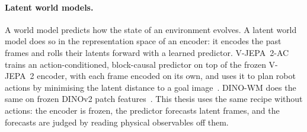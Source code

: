 \paragraph{Latent world models.} A world model predicts how the state of an environment
evolves. A latent world model does so in the representation space of an encoder: it
encodes the past frames and rolls their latents forward with a learned predictor.
V-JEPA~2-AC trains an action-conditioned, block-causal predictor on top of the frozen
V-JEPA~2 encoder, with each frame encoded on its own, and uses it to plan robot actions
by minimising the latent distance to a goal image~\cite{assran2025vjepa2}. DINO-WM does
the same on frozen DINOv2 patch features~\cite{dinowm}. This thesis uses the same recipe
without actions: the encoder is frozen, the predictor forecasts latent frames, and the
forecasts are judged by reading physical observables off them.
